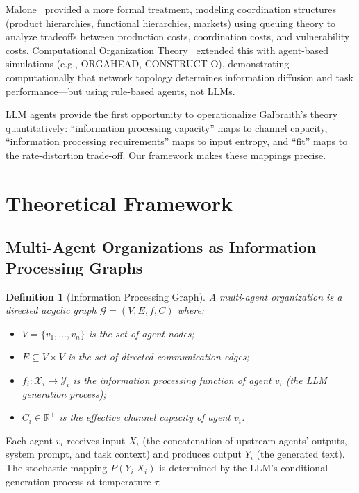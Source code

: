 \documentclass[conference]{IEEEtran}
\newtheorem{definition}{Definition}
\begin{document}
Malone~\cite{malone1987coordination} provided a more formal treatment, modeling coordination structures (product hierarchies, functional hierarchies, markets) using queuing theory to analyze tradeoffs between production costs, coordination costs, and vulnerability costs.
Computational Organization Theory~\cite{carley2002computational} extended this with agent-based simulations (e.g., ORGAHEAD, CONSTRUCT-O), demonstrating computationally that network topology determines information diffusion and task performance---but using rule-based agents, not LLMs.

LLM agents provide the first opportunity to operationalize Galbraith's theory quantitatively:
``information processing capacity'' maps to channel capacity,
``information processing requirements'' maps to input entropy,
and ``fit'' maps to the rate-distortion trade-off.
Our framework makes these mappings precise.

\section{Theoretical Framework}
\label{sec:theory}

\subsection{Multi-Agent Organizations as Information Processing Graphs}

\begin{definition}[Information Processing Graph]
A multi-agent organization is a directed acyclic graph $\mathcal{G} = (V, E, f, C)$ where:
\begin{itemize}
    \item $V = \{v_1, \ldots, v_n\}$ is the set of agent nodes;
    \item $E \subseteq V \times V$ is the set of directed communication edges;
    \item $f_i: \mathcal{X}_i \to \mathcal{Y}_i$ is the information processing function of agent $v_i$ (the LLM generation process);
    \item $C_i \in \mathbb{R}^+$ is the effective channel capacity of agent $v_i$.
\end{itemize}
\end{definition}

Each agent $v_i$ receives input $X_i$ (the concatenation of upstream agents' outputs, system prompt, and task context) and produces output $Y_i$ (the generated text).
The stochastic mapping $P(Y_i | X_i)$ is determined by the LLM's conditional generation process at temperature $\tau$.
\end{document}
